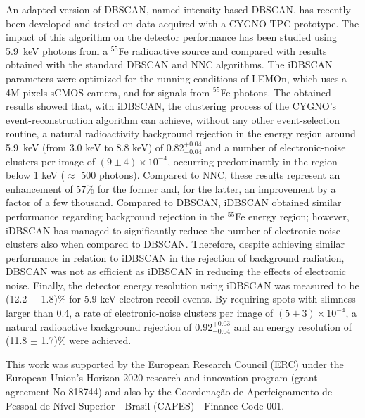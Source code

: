 \documentclass[a4paper,11pt]{article}
\begin{document}
An adapted version of DBSCAN, named intensity-based DBSCAN, has recently been developed and tested on data acquired with a CYGNO TPC prototype. The impact of this algorithm on the detector performance has been studied using 5.9~keV photons from a $^{55}$Fe radioactive source and compared with results obtained with the standard DBSCAN and NNC algorithms.
The iDBSCAN parameters were optimized for the running conditions of LEMOn, which uses a 4M pixels sCMOS camera, and for signals from $^{55}$Fe photons.
The obtained results showed that, with iDBSCAN, the clustering process of the CYGNO's event-reconstruction algorithm can achieve, without any other event-selection routine, a natural radioactivity background rejection in the energy region around 5.9~keV (from 3.0 keV to 8.8 keV) of 0.82$^{+0.04}_{-0.04}$ and a number of electronic-noise clusters per image of $(9 \pm 4)\times 10^{-4}$, occurring predominantly in the region below 1 keV ($\approx$ 500 photons).
Compared to NNC, these results represent an enhancement of 57\% for the former and, for the latter, an improvement by a factor of a few thousand. 
Compared to DBSCAN, iDBSCAN obtained similar performance regarding background rejection in the $^{55}$Fe energy region; however, iDBSCAN has managed to significantly reduce the number of electronic noise clusters also when compared to DBSCAN.
Therefore, despite achieving similar performance in relation to iDBSCAN in the rejection of background radiation, DBSCAN was not as efficient as iDBSCAN in reducing the effects of electronic noise.
Finally, the detector energy resolution using iDBSCAN was measured to be (12.2 $\pm$ 1.8)\% for 5.9 keV electron recoil events. By requiring spots with slimness larger than 0.4, a rate of electronic-noise clusters per image of $(5 \pm 3)\times 10^{-4}$, a natural radioactive background rejection of 0.92$^{+0.03}_{-0.04}$ and an energy resolution of (11.8 $\pm$ 1.7)\% were achieved.

\acknowledgments
This work was supported by the European Research Council (ERC) under the European Union’s Horizon 2020 research and innovation program (grant agreement No 818744) and also by the Coordenação de Aperfeiçoamento de Pessoal de Nível Superior - Brasil (CAPES) - Finance Code 001.




\end{document}
